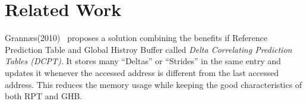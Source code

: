 \section{Related Work} %

Grannæs(2010)~\cite{grannaes2010} proposes a solution combining the benefits if
Reference Prediction Table and Global Histroy Buffer called \textit{Delta
Correlating Prediction Tables (DCPT)}. It stores many ``Deltas'' or ``Strides''
in the same entry and updates it whenever the accessed address is different from
the last accessed address. This reduces the memory usage while keeping the good
characteristics of both RPT and GHB.

